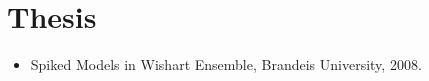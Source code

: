 \documentclass[12pt, a4paper]{article}
\begin{document}
\section*{Thesis}

\begin{itemize}
\item
  Spiked Models in Wishart Ensemble, Brandeis University, 2008.
\end{itemize}
\end{document}
